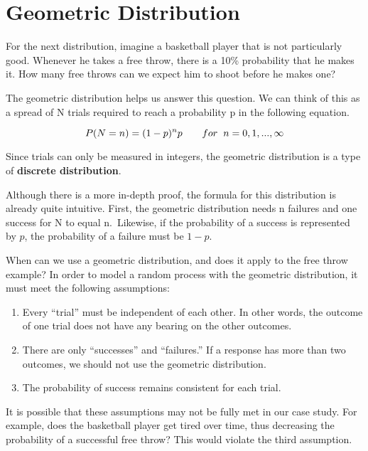 \documentclass[
]{book}
\begin{document}
\hypertarget{Geometric}{%
\section{Geometric Distribution}\label{Geometric}}

For the next distribution, imagine a basketball player that is not particularly good. Whenever he takes a free throw, there is a 10\% probability that he makes it. How many free throws can we expect him to shoot before he makes one?

The geometric distribution helps us answer this question. We can think of this as a spread of N trials required to reach a probability p in the following equation.

\[P(N = n) = (1-p)^{n} p \hspace{0.7cm}for\hspace{0.2cm} n=0,1,...,\infty\]

Since trials can only be measured in integers, the geometric distribution is a type of \textbf{discrete distribution}.

Although there is a more in-depth proof, the formula for this distribution is already quite intuitive. First, the geometric distribution needs n failures and one success for N to equal n.~Likewise, if the probability of a success is represented by \(p\), the probability of a failure must be \(1-p\).

When can we use a geometric distribution, and does it apply to the free throw example? In order to model a random process with the geometric distribution, it must meet the following assumptions:

\begin{enumerate}
\def\labelenumi{\arabic{enumi}.}
\item
  Every ``trial'' must be independent of each other. In other words, the outcome of one trial does not have any bearing on the other outcomes.
\item
  There are only ``successes'' and ``failures.'' If a response has more than two outcomes, we should not use the geometric distribution.
\item
  The probability of success remains consistent for each trial.
\end{enumerate}

It is possible that these assumptions may not be fully met in our case study. For example, does the basketball player get tired over time, thus decreasing the probability of a successful free throw? This would violate the third assumption.
\end{document}
